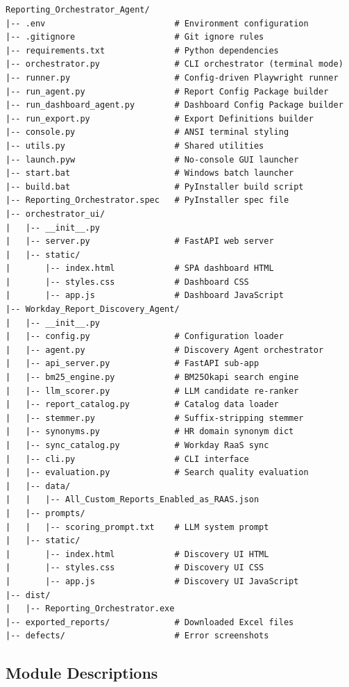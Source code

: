 \documentclass[12pt,a4paper]{article}
\begin{document}
\begin{lstlisting}[caption={Complete Project Tree}, label={lst:project-tree}, language={}]
Reporting_Orchestrator_Agent/
|-- .env                          # Environment configuration
|-- .gitignore                    # Git ignore rules
|-- requirements.txt              # Python dependencies
|-- orchestrator.py               # CLI orchestrator (terminal mode)
|-- runner.py                     # Config-driven Playwright runner
|-- run_agent.py                  # Report Config Package builder
|-- run_dashboard_agent.py        # Dashboard Config Package builder
|-- run_export.py                 # Export Definitions builder
|-- console.py                    # ANSI terminal styling
|-- utils.py                      # Shared utilities
|-- launch.pyw                    # No-console GUI launcher
|-- start.bat                     # Windows batch launcher
|-- build.bat                     # PyInstaller build script
|-- Reporting_Orchestrator.spec   # PyInstaller spec file
|-- orchestrator_ui/
|   |-- __init__.py
|   |-- server.py                 # FastAPI web server
|   |-- static/
|       |-- index.html            # SPA dashboard HTML
|       |-- styles.css            # Dashboard CSS
|       |-- app.js                # Dashboard JavaScript
|-- Workday_Report_Discovery_Agent/
|   |-- __init__.py
|   |-- config.py                 # Configuration loader
|   |-- agent.py                  # Discovery Agent orchestrator
|   |-- api_server.py             # FastAPI sub-app
|   |-- bm25_engine.py            # BM25Okapi search engine
|   |-- llm_scorer.py             # LLM candidate re-ranker
|   |-- report_catalog.py         # Catalog data loader
|   |-- stemmer.py                # Suffix-stripping stemmer
|   |-- synonyms.py               # HR domain synonym dict
|   |-- sync_catalog.py           # Workday RaaS sync
|   |-- cli.py                    # CLI interface
|   |-- evaluation.py             # Search quality evaluation
|   |-- data/
|   |   |-- All_Custom_Reports_Enabled_as_RAAS.json
|   |-- prompts/
|   |   |-- scoring_prompt.txt    # LLM system prompt
|   |-- static/
|       |-- index.html            # Discovery UI HTML
|       |-- styles.css            # Discovery UI CSS
|       |-- app.js                # Discovery UI JavaScript
|-- dist/
|   |-- Reporting_Orchestrator.exe
|-- exported_reports/             # Downloaded Excel files
|-- defects/                      # Error screenshots
\end{lstlisting}

\subsection{Module Descriptions}
\label{subsec:module-descriptions}
\end{document}
